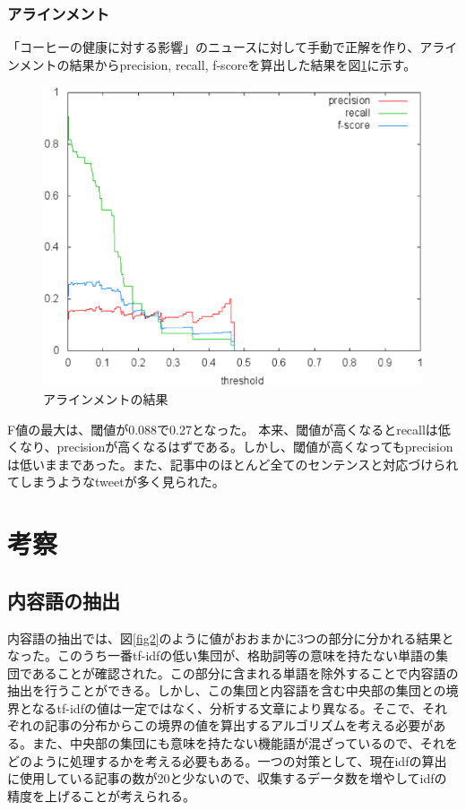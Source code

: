 \documentclass[12pt]{jarticle}
\begin{document}
\subsubsection{アラインメント}
「コーヒーの健康に対する影響」のニュースに対して手動で正解を作り、アラインメントの結果からprecision, recall, f-scoreを算出した結果を図\ref{fig3}に示す。
\begin{figure}[htbp]
  \begin{center}
    \includegraphics[scale=0.5]{image/score.eps}
  \end{center}
  \caption{アラインメントの結果}
  \label{fig3}
\end{figure}

F値の最大は、閾値が0.088で0.27となった。
本来、閾値が高くなるとrecallは低くなり、precisionが高くなるはずである。しかし、閾値が高くなってもprecisionは低いままであった。また、記事中のほとんど全てのセンテンスと対応づけられてしまうようなtweetが多く見られた。

\section{考察}
\subsection{内容語の抽出}
内容語の抽出では、図\ref{fig2}のように値がおおまかに3つの部分に分かれる結果となった。このうち一番tf-idfの低い集団が、格助詞等の意味を持たない単語の集団であることが確認された。この部分に含まれる単語を除外することで内容語の抽出を行うことができる。しかし、この集団と内容語を含む中央部の集団との境界となるtf-idfの値は一定ではなく、分析する文章により異なる。そこで、それぞれの記事の分布からこの境界の値を算出するアルゴリズムを考える必要がある。また、中央部の集団にも意味を持たない機能語が混ざっているので、それをどのように処理するかを考える必要もある。一つの対策として、現在idfの算出に使用している記事の数が20と少ないので、収集するデータ数を増やしてidfの精度を上げることが考えられる。
\end{document}
